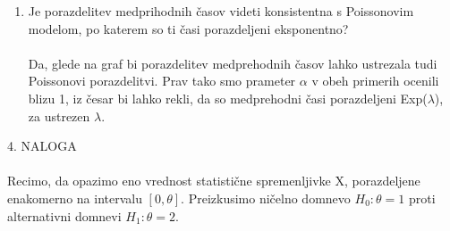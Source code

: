\documentclass[a4paper]{article}
\begin{document}
\begin{enumerate}[label=(\alph*)]
\item Je porazdelitev medprihodnih časov videti konsistentna s Poissonovim modelom, po katerem so ti časi porazdeljeni eksponentno? \\ \\
Da, glede na graf bi porazdelitev medprehodnih časov lahko ustrezala tudi Poissonovi porazdelitvi. Prav tako smo prameter $\alpha$ v obeh primerih ocenili blizu 1, iz česar bi lahko rekli, da so medprehodni časi porazdeljeni Exp($\lambda$), za ustrezen $\lambda$.
\end{enumerate}

\large{4. NALOGA} \\ \\
Recimo, da opazimo eno vrednost statistične spremenljivke X, porazdeljene enakomerno na intervalu $[0, \theta]$. Preizkusimo ničelno domnevo $H_0 : \theta = 1$ proti alternativni domnevi $H_1: \theta=2$.
\end{document}
